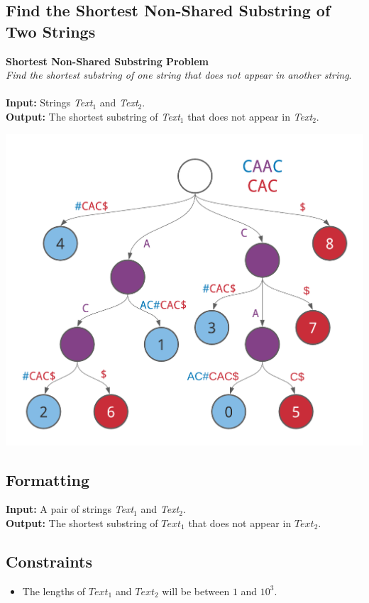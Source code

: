 \documentclass{article}
\begin{document}
\subsection{Find the Shortest Non-Shared Substring of Two Strings}
\hline\vspace{5}
\textbf{Shortest Non-Shared Substring Problem}\\
\emph{Find the shortest substring of one string that does not appear in another string}.\\ \\
\textbf{Input:} Strings \emph{Text}$_1$ and \emph{Text}$_2$.\\
\textbf{Output:} The shortest substring of \emph{Text}$_1$ that does not appear in \emph{Text}$_2$.
\begin{center}
    \includegraphics[scale=0.2]{c9/logos/9F.png}
\end{center}
\hline \vspace{5}

\subsection*{Formatting}
\textbf{Input:} A pair of strings \emph{Text}$_1$ and \emph{Text}$_2$.\\
\noindent\textbf{Output:} The shortest substring of $Text_1$ that does not appear in $Text_2$.

\subsection*{Constraints}
\begin{itemize}
    \item The lengths of $Text_1$ and $Text_2$ will be between $1$ and $10^3$.
\end{itemize}
\pagebreak
\end{document}
